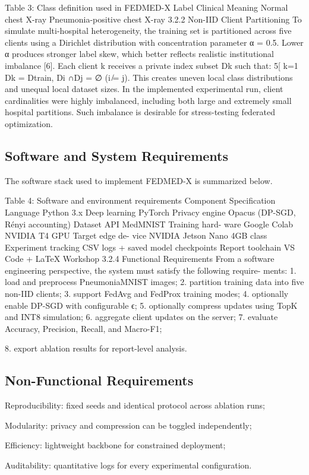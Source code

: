 Table 3: Class definition used in FEDMED-X
Label
Clinical Meaning
Normal chest X-ray
Pneumonia-positive chest X-ray 3.2.2
Non-IID Client Partitioning
To simulate multi-hospital heterogeneity, the training set is partitioned across five clients using a Dirichlet distribution with concentration parameter α = 0.5. Lower α produces stronger label skew, which better reflects realistic institutional imbalance [6].
Each client k receives a private index subset Dk such that:
5[ k=1
Dk = Dtrain,
Di ∩Dj = ∅ (i ̸= j).
This creates uneven local class distributions and unequal local dataset sizes. In the implemented experimental run, client cardinalities were highly imbalanced, including both large and extremely small hospital partitions. Such imbalance is desirable for stress-testing federated optimization.
\subsection{Software and System Requirements}
The software stack used to implement FEDMED-X is summarized below.

Table 4: Software and environment requirements
Component
Specification
Language
Python 3.x
Deep learning
PyTorch
Privacy engine
Opacus (DP-SGD, Rényi accounting)
Dataset API
MedMNIST
Training hard- ware
Google Colab NVIDIA T4 GPU
Target edge de- vice
NVIDIA Jetson Nano 4GB class
Experiment tracking
CSV logs + saved model checkpoints
Report toolchain
VS Code + LaTeX Workshop 3.2.4
Functional Requirements
From a software engineering perspective, the system must satisfy the following require- ments:
1. load and preprocess PneumoniaMNIST images; 2. partition training data into five non-IID clients; 3. support FedAvg and FedProx training modes; 4. optionally enable DP-SGD with configurable ϵ; 5. optionally compress updates using TopK and INT8 simulation; 6. aggregate client updates on the server; 7. evaluate Accuracy, Precision, Recall, and Macro-F1;

8. export ablation results for report-level analysis.
\subsection{Non-Functional Requirements}
\item Reproducibility: fixed seeds and identical protocol across ablation runs;
\item Modularity: privacy and compression can be toggled independently;
\item Efficiency: lightweight backbone for constrained deployment;
\item Auditability: quantitative logs for every experimental configuration.
